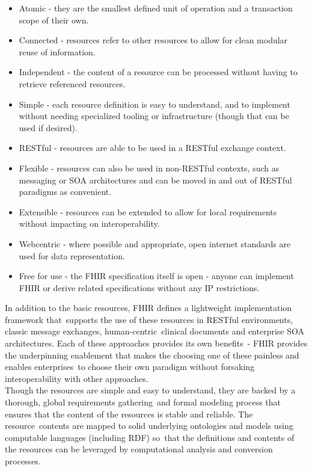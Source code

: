 \documentclass[DIV=calc, paper=a4, fontsize=12pt, onecolumn]{scrartcl}	 %
\begin{document}
{\begin{itemize}
\item Atomic - they are the smallest defined unit of operation and a transaction scope of their own.
\item Connected - resources refer to other resources to allow for clean modular reuse of information.
\item Independent - the content of a resource can be processed without having to retrieve referenced resources.
\item Simple - each resource definition is easy to understand, and to implement without needing specialized tooling or infrastructure (though that can be used if desired).
\item RESTful - resources are able to be used in a RESTful exchange context.
\item Flexible - resources can also be used in non-RESTful contexts, such as messaging or SOA architectures and can be moved in and out of RESTful paradigms as convenient.
\item Extensible - resources can be extended to allow for local requirements without impacting on interoperability.
\item Webcentric - where possible and appropriate, open internet standards are used for data representation.
\item Free for use - the FHIR specification itself is open - anyone can implement FHIR or derive related specifications without any IP restrictions.
\end{itemize}

In addition to the basic resources, FHIR defines a lightweight implementation framework that\
supports the use of these resources in RESTful environments, classic message exchanges, human-centric\
 clinical documents and enterprise SOA architectures. Each of these approaches provides its own benefits\ 
- FHIR provides the underpinning enablement that makes the choosing one of these painless and enables enterprises\
 to choose their own paradigm without forsaking interoperability with other approaches.\\

Though the resources are simple and easy to understand, they are backed by a thorough, global requirements gathering\
 and formal modeling process that ensures that the content of the resources is stable and reliable. The resource\
contents are mapped to solid underlying ontologies and models using computable languages (including RDF) so\
that the definitions and contents of the resources can be leveraged by computational analysis and conversion processes.\\

}
\end{document}
